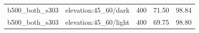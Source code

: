 \begin{longtable}{l>{\raggedright\arraybackslash}p{.42\linewidth}rrr}
b500\_\allowbreak{}both\_\allowbreak{}s303 & %
elevation:45\_\allowbreak{}60/dark & %
400 & %
71.50 & %
98.84 \\ %

b500\_\allowbreak{}both\_\allowbreak{}s303 & %
elevation:45\_\allowbreak{}60/light & %
400 & %
69.75 & %
98.80 \\ %


\end{longtable}
